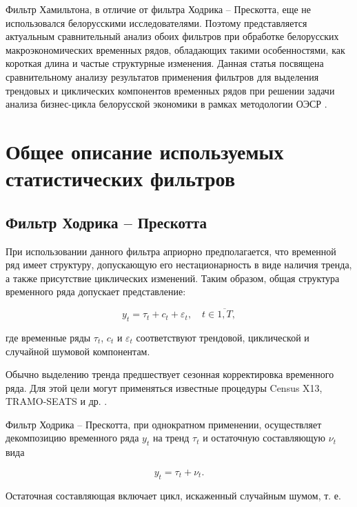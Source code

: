 \documentclass[a4paper,14pt]{extreport}
\begin{document}
	Фильтр Хамильтона, в отличие от фильтра Ходрика -- Прескотта, еще не использовался белорусскими исследователями. Поэтому представляется актуальным сравнительный анализ обоих фильтров при обработке белорусских макроэкономических временных рядов, обладающих такими особенностями, как короткая длина и частые структурные изменения. Данная статья посвящена сравнительному анализу результатов применения фильтров для выделения трендовых и циклических компонентов временных рядов при решении задачи анализа бизнес-цикла белорусской экономики в рамках методологии ОЭСР \cite{oecdCycleExtraction, esiMaking}. 
	
	\section{Общее описание используемых статистических фильтров}
	
	\subsection{Фильтр Ходрика -- Прескотта}
	
	При использовании данного фильтра априорно предполагается, что временной ряд   имеет структуру, допускающую его нестационарность в виде наличия тренда, а также присутствие циклических изменений. Таким образом, общая структура временного ряда допускает представление:
	
	\begin{equation}
	y_t = \tau_t + c_t + \varepsilon_t, \quad t \in \overline{1,T},
	\label{eq:decomposition}
	\end{equation}
	
	где временные ряды  $\tau_t$, $c_t$ и $\varepsilon_t$ соответствуют трендовой, циклической и случайной шумовой компонентам. 
	
	Обычно выделению тренда предшествует сезонная корректировка временного ряда. Для этой цели могут применяться известные процедуры Census X13, TRAMO-SEATS и др. \cite{oecdCycleExtraction, esiMakingAlt}. 
	
	Фильтр Ходрика -- Прескотта, при однократном применении, осуществляет декомпозицию временного ряда $y_t$ на тренд $\tau_t$ и остаточную составляющую $\nu_t$ вида
	
	\begin{equation}
	y_t = \tau_t + \nu_t .
	\label{eq:decomp1}
	\end{equation}
	
	Остаточная составляющая включает цикл, искаженный случайным шумом, т. е. 
	
\end{document}
